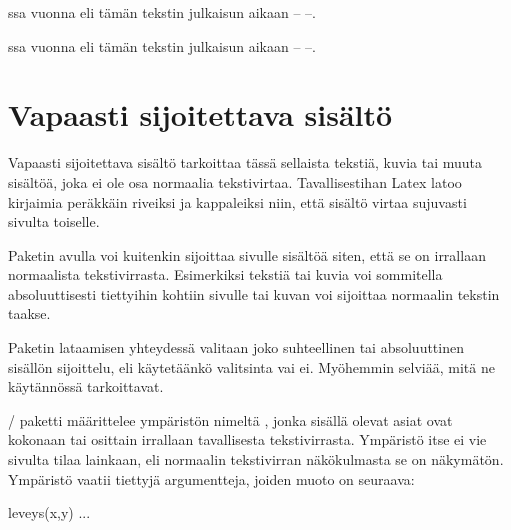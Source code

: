 \begin{koodilohkosis}
ssa vuonna 
eli tämän tekstin julkaisun aikaan -- --.
\end{koodilohkosis}

\begin{tulossis}
  ssa vuonna 
  eli tämän tekstin julkaisun aikaan -- --.
\end{tulossis}

\section{Vapaasti sijoitettava sisältö}

Vapaasti sijoitettava sisältö tarkoittaa tässä sellaista tekstiä, kuvia
tai muuta sisältöä, joka ei ole osa normaalia tekstivirtaa.
Tavallisestihan Latex latoo kirjaimia peräkkäin riveiksi ja kappaleiksi
niin, että sisältö virtaa sujuvasti sivulta toiselle.

Paketin  avulla voi kuitenkin sijoittaa sivulle
sisältöä siten, että se on irrallaan normaalista tekstivirrasta.
Esimerkiksi tekstiä tai kuvia voi sommitella absoluuttisesti tiettyihin
kohtiin sivulle tai kuvan voi sijoittaa normaalin tekstin taakse.

Paketin lataamisen yhteydessä valitaan joko suhteellinen tai
absoluuttinen sisällön sijoittelu, eli käytetäänkö valitsinta
 vai ei. Myöhemmin selviää, mitä ne käytännössä
tarkoittavat.

\begin{koodilohkosis}
\usepackage{textpos}            %
\usepackage[absolute]{textpos}  %
\end{koodilohkosis}

\noindent
{}\-/ paketti määrittelee ympäristön nimeltä
, jonka sisällä olevat asiat ovat kokonaan tai
osittain irrallaan tavallisesta tekstivirrasta. Ympäristö itse ei vie
sivulta tilaa lainkaan, eli normaalin tekstivirran näkökulmasta se on
näkymätön. Ympäristö vaatii tiettyjä argumentteja, joiden muoto on
seuraava:

\begin{koodilohkosis}
\begin{textblock}{leveys}(x,y)
  ...
\end{textblock}
\end{koodilohkosis}

